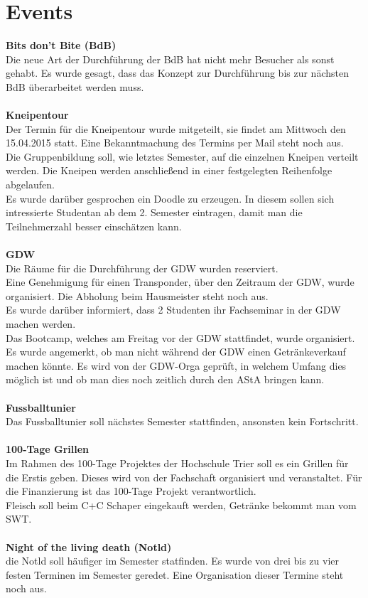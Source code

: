 \documentclass[a4paper, 11pt]{article} %
\begin{document}
\section{Events}
\textbf{Bits don't Bite (BdB)} \\
Die neue Art der Durchführung der BdB hat nicht mehr Besucher als sonst gehabt. Es wurde gesagt, dass das Konzept zur Durchführung bis zur nächsten BdB überarbeitet werden muss. \\
\\
\textbf{Kneipentour} \\
Der Termin für die Kneipentour wurde mitgeteilt, sie findet am Mittwoch den 15.04.2015 statt. Eine Bekanntmachung des Termins per Mail steht noch aus.\\
Die Gruppenbildung soll, wie letztes Semester, auf die einzelnen Kneipen verteilt werden. Die Kneipen werden anschließend in einer festgelegten Reihenfolge abgelaufen. \\
Es wurde darüber gesprochen ein Doodle zu erzeugen. In diesem sollen sich intressierte Studentan ab dem 2. Semester eintragen, damit man die Teilnehmerzahl besser einschätzen kann. \\
\\
\textbf{GDW} \\
Die Räume für die Durchführung der GDW wurden reserviert. \\
Eine Genehmigung für einen Transponder, über den Zeitraum der GDW, wurde organisiert. Die Abholung beim Hausmeister steht noch aus. \\
Es wurde darüber informiert, dass 2 Studenten ihr Fachseminar in der GDW machen werden. \\
Das Bootcamp, welches am Freitag vor der GDW stattfindet, wurde organisiert. \\
Es wurde angemerkt, ob man nicht während der GDW einen Getränkeverkauf machen könnte. Es wird von der GDW-Orga geprüft, in welchem Umfang dies möglich ist und ob man dies noch zeitlich durch den AStA bringen kann. \\
\\
\textbf{Fussballtunier} \\
Das Fussballtunier soll nächstes Semester stattfinden, ansonsten kein Fortschritt. \\
\\
\textbf{100-Tage Grillen} \\
Im Rahmen des 100-Tage Projektes der Hochschule Trier soll es ein Grillen für die Erstis geben. Dieses wird von der Fachschaft organisiert und veranstaltet. Für die Finanzierung ist das 100-Tage Projekt verantwortlich. \\
Fleisch soll beim C+C Schaper eingekauft werden, Getränke bekommt man vom SWT.\\
\\
\textbf{Night of the living death (Notld)} \\
die Notld soll häufiger im Semester statfinden. Es wurde von drei bis zu vier festen Terminen im Semester geredet. Eine Organisation dieser Termine steht noch aus. \\
\end{document}
